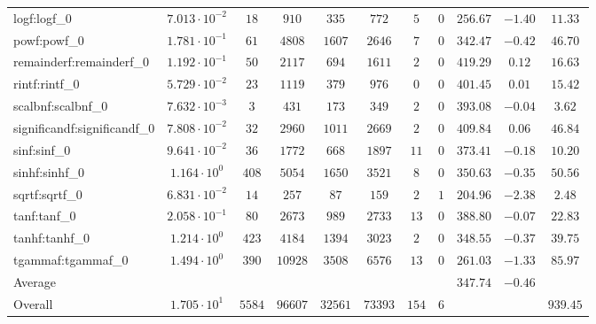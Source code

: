 \begin{tabular}{|l|c|c|c|c|c|c|c|c|c|c|}
logf:logf\_0                 & $ 7.013 \cdot 10^{-2} $ & $ 18     $ & $ 910   $ & $ 335   $ & $ 772   $ & $ 5   $ & $ 0 $ & $ 256.67      $ & $ -1.40   $ & $ 11.33   $ \\
powf:powf\_0                 & $ 1.781 \cdot 10^{-1} $ & $ 61     $ & $ 4808  $ & $ 1607  $ & $ 2646  $ & $ 7   $ & $ 0 $ & $ 342.47      $ & $ -0.42   $ & $ 46.70   $ \\
remainderf:remainderf\_0     & $ 1.192 \cdot 10^{-1} $ & $ 50     $ & $ 2117  $ & $ 694   $ & $ 1611  $ & $ 2   $ & $ 0 $ & $ 419.29      $ & $ 0.12    $ & $ 16.63   $ \\
rintf:rintf\_0               & $ 5.729 \cdot 10^{-2} $ & $ 23     $ & $ 1119  $ & $ 379   $ & $ 976   $ & $ 0   $ & $ 0 $ & $ 401.45      $ & $ 0.01    $ & $ 15.42   $ \\
scalbnf:scalbnf\_0           & $ 7.632 \cdot 10^{-3} $ & $ 3      $ & $ 431   $ & $ 173   $ & $ 349   $ & $ 2   $ & $ 0 $ & $ 393.08      $ & $ -0.04   $ & $ 3.62    $ \\
significandf:significandf\_0 & $ 7.808 \cdot 10^{-2} $ & $ 32     $ & $ 2960  $ & $ 1011  $ & $ 2669  $ & $ 2   $ & $ 0 $ & $ 409.84      $ & $ 0.06    $ & $ 46.84   $ \\
sinf:sinf\_0                 & $ 9.641 \cdot 10^{-2} $ & $ 36     $ & $ 1772  $ & $ 668   $ & $ 1897  $ & $ 11  $ & $ 0 $ & $ 373.41      $ & $ -0.18   $ & $ 10.20   $ \\
sinhf:sinhf\_0               & $ 1.164 \cdot 10^{0}  $ & $ 408    $ & $ 5054  $ & $ 1650  $ & $ 3521  $ & $ 8   $ & $ 0 $ & $ 350.63      $ & $ -0.35   $ & $ 50.56   $ \\
sqrtf:sqrtf\_0               & $ 6.831 \cdot 10^{-2} $ & $ 14     $ & $ 257   $ & $ 87    $ & $ 159   $ & $ 2   $ & $ 1 $ & $ 204.96      $ & $ -2.38   $ & $ 2.48    $ \\
tanf:tanf\_0                 & $ 2.058 \cdot 10^{-1} $ & $ 80     $ & $ 2673  $ & $ 989   $ & $ 2733  $ & $ 13  $ & $ 0 $ & $ 388.80      $ & $ -0.07   $ & $ 22.83   $ \\
tanhf:tanhf\_0               & $ 1.214 \cdot 10^{0}  $ & $ 423    $ & $ 4184  $ & $ 1394  $ & $ 3023  $ & $ 2   $ & $ 0 $ & $ 348.55      $ & $ -0.37   $ & $ 39.75   $ \\
tgammaf:tgammaf\_0           & $ 1.494 \cdot 10^{0}  $ & $ 390    $ & $ 10928 $ & $ 3508  $ & $ 6576  $ & $ 13  $ & $ 0 $ & $ 261.03      $ & $ -1.33   $ & $ 85.97   $ \\
\hline
Average                      & $                     $ & $        $ & $       $ & $       $ & $       $ & $     $ & $   $ & $ 347.74      $ & $ -0.46   $ & $         $ \\
\hline
Overall                      & $ 1.705 \cdot 10^{1}  $ & $ 5584   $ & $ 96607 $ & $ 32561 $ & $ 73393 $ & $ 154 $ & $ 6 $ & $             $ & $         $ & $ 939.45  $ \\
\hline
\end{tabular}
